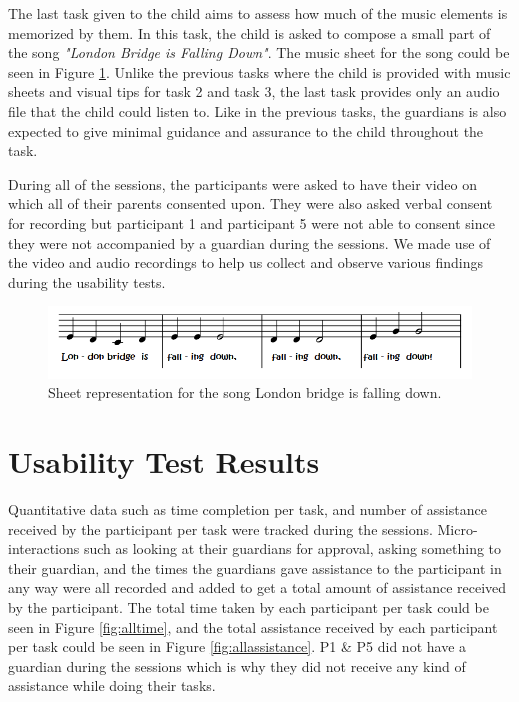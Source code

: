 The last task given to the child aims to assess how much of the music elements is memorized by them. In this task, the child is asked to compose a small part of the song \textit{"London Bridge is Falling Down"}. The music sheet for the song could be seen in Figure \ref{fig:LBIFDMusicSheet}. Unlike the previous tasks where the child is provided with music sheets and visual tips for task 2 and task 3, the last task provides only an audio file that the child could listen to. Like in the previous tasks, the guardians is also expected to give minimal guidance and assurance to the child throughout the task. 

During all of the sessions, the participants were asked to have their video on which all of their parents consented upon. They were also asked verbal consent for recording but participant 1 and participant 5 were not able to consent since they were not accompanied by a guardian during the sessions. We made use of the video and audio recordings to help us collect and observe various findings during the usability tests. 

\begin{figure}[H]
    \centering
    \includegraphics[width=15cm]{figures/NewFigures/LondonBridgeMusicSheet.png}
    \caption{Sheet representation for the song London bridge is falling down.}
    \label{fig:LBIFDMusicSheet}
\end{figure}


\section{Usability Test Results}
Quantitative data such as time completion per task, and number of assistance received by the participant per task were tracked during the sessions. Micro-interactions such as looking at their guardians for approval, asking something to their guardian, and the times the guardians gave assistance to the participant in any way were all recorded and added to get a total amount of assistance received by the participant. The total time taken by each participant per task could be seen in Figure \ref{fig:alltime}, and the total assistance received by each participant per task could be seen in Figure \ref{fig:allassistance}. P1 \& P5 did not have a guardian during the sessions which is why they did not receive any kind of assistance while doing their tasks.

